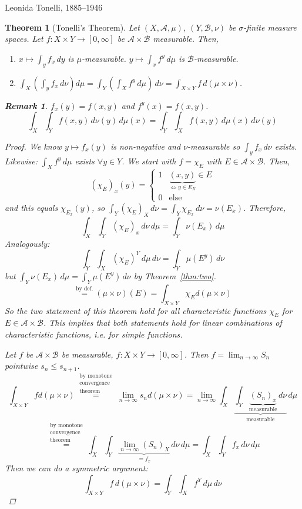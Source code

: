 \documentclass{article}
\newtheorem{theorem}{Theorem}  \numberwithin{theorem}{section}
\newtheorem{remark}{Remark}  \numberwithin{remark}{section}
\newcommand{\mtn}{(\mu\times\nu)} %
\begin{document}
Leonida Tonelli, 1885--1946

\begin{theorem}[Tonelli's Theorem]
  Let $(X, \mathcal A, \mu)$, $(Y, \mathcal B, \nu)$ be $\sigma$-finite measure spaces.
  Let $f: X \times Y \to [0, \infty]$ be $\mathcal A \times \mathcal B$ measurable. Then,
  \begin{enumerate}
    \item $x \mapsto \int_y f_x \, dy$ is $\mu$-measurable. $y \mapsto \int_x f^y \, d\mu$ is $\mathcal B$-measurable.
    \item $\int_X \left( \int_y f_x \, d\nu\right) d\mu = \int_Y \left(\int_X f^y \, d\mu\right) \, d\nu = \int_{X \times Y} f \, d(\mu \times \nu)$.
  \end{enumerate}
\begin{remark}
  $f_x(y) = f(x, y)$ and $f^y(x) = f(x,y)$.
  \[ \int_X \int_Y f(x,y) \, d\nu(y) \, d\mu(x) = \int_Y \int_X f(x,y) \, d\mu(x) \, d\nu(y) \]
\end{remark}
\begin{proof}
  We know $y \mapsto f_x(y)$ is non-negative and $\nu$-measurable so $\int_y f_x\, d\nu$ exists.
  Likewise: $\int_X f^y \, d\mu$ exists $\forall y \in Y$.
  We start with $f = \chi_E$ with $E \in \mathcal A \times \mathcal B$.
  Then, \[ (\chi_E)_x(y) = \begin{cases} 1 & \underbrace{(x,y)}_{\Leftrightarrow y \in E_X} \in E \\ 0 & \text{else} \end{cases} \]
  and this equals $\chi_{E_x}(y)$, so  $\int_Y(\chi_E)_X\,d\nu = \int_Y \chi_{E_x} \, d\nu = \nu(E_x)$. Therefore,
  \[ \int_X \int_Y (\chi_E)_x \, d\nu \, d\mu = \int_Y \nu(E_x) \,d\mu \]
  Analogously:
  \[ \int_Y \int_X (\chi_E)^Y \, d\mu \, d\nu = \int_Y \mu(E^y) \, d\nu \]
  but $\int_Y \nu(E_x) \,d\mu = \int_Y \mu(E^y) \, d\nu$ by Theorem~\ref{thm:two}.
  \[ \stackrel{\text{by def.}}{=} \mtn(E) = \int_{X\times Y} \chi_E d\mtn \]
  So the two statement of this theorem hold for all characteristic functions $\chi_E$ for $E \in \mathcal A \times \mathcal B$.
  This implies that both statements hold for linear combinations of characteristic functions, i.e. for simple functions.

  Let $f$ be $\mathcal A \times \mathcal B$ be measurable, $f: X \times Y \to [0, \infty]$. Then
  $f = \lim_{n\to\infty} S_n$ pointwise $s_n \leq s_{n+1}$.
  \[ \int_{X\times Y} f d\mtn \stackrel{\substack{\text{by monotone} \\ \text{convergence} \\ \text{theorem}}}{=} \lim_{n\to\infty} s_n d \mtn = \lim_{n\to\infty} \int_X \underbrace{\int_Y \underbrace{(S_n)_x}_{\text{measurable}} \, d\nu}_{\text{measurable}} \, d\mu \]
  \[ \stackrel{\substack{\text{by monotone} \\ \text{convergence} \\ \text{theorem}}}{=} \int_X \int_Y \underbrace{\lim_{n\to\infty} (S_n)_X}_{=f_x} \, d\nu \, d\mu = \int_X \int_Y f_x \, d\nu \, d\mu \]
  Then we can do a symmetric argument:
  \[ \int_{X \times Y} f \, d(\mu \times \nu) = \int_Y \int_X f^Y \, d\mu \, d\nu \]
\end{proof}

\end{theorem}


\printindex
\end{document}
